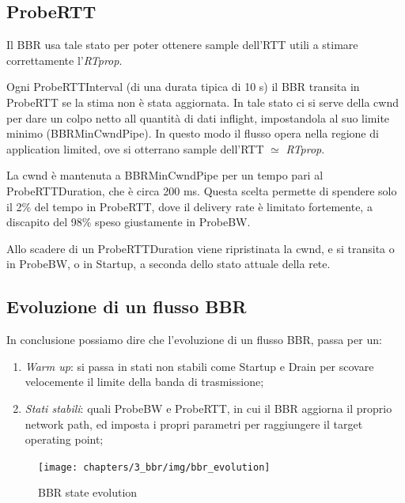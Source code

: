 \subsection{ProbeRTT} \label{ProbeRTT}

Il BBR usa tale stato per poter ottenere sample dell'RTT utili a stimare correttamente l'\textit{RTprop}. \bigskip

Ogni ProbeRTTInterval (di una durata tipica di 10 s) il BBR transita in ProbeRTT se la stima non è stata aggiornata. In tale stato ci si serve della cwnd per dare un colpo netto all quantità di dati inflight, impostandola al suo limite minimo (BBRMinCwndPipe). In questo modo il flusso opera nella regione di application limited, ove si otterrano sample dell'RTT $ \simeq $ \textit{RTprop}. \bigskip

La cwnd è mantenuta a BBRMinCwndPipe per un tempo pari al ProbeRTTDuration, che è circa 200 ms. Questa scelta permette di spendere solo il 2\% del tempo in ProbeRTT, dove il delivery rate è limitato fortemente, a discapito del 98\% speso giustamente in ProbeBW. \bigskip

Allo scadere di un ProbeRTTDuration viene ripristinata la cwnd, e si transita o in ProbeBW, o in Startup, a seconda dello stato attuale della rete.

\subsection{Evoluzione di un flusso BBR}

In conclusione possiamo dire che l'evoluzione di un flusso BBR, passa per un:

\begin{enumerate}

\item \textit{Warm up}: si passa in stati non stabili come Startup e Drain per scovare velocemente il limite della banda di trasmissione;

\item \textit{Stati stabili}: quali ProbeBW e ProbeRTT, in cui il BBR aggiorna il proprio network path, ed imposta i propri parametri per raggiungere il target operating point;

\end{enumerate}

\begin{figure}[H]

\center
\caption{BBR state evolution}
\texttt{[image: chapters/3\_bbr/img/bbr\_evolution]}

\end{figure}   
